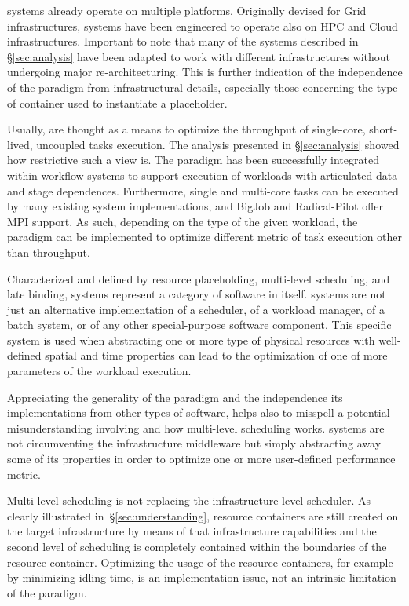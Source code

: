 \documentclass{sig-alternate}
\begin{document}
\pilot systems already operate on multiple platforms. Originally devised for
Grid infrastructures, \pilot systems have been engineered to operate also on
HPC and Cloud infrastructures. Important to note that many of the \pilot
systems described in \S\ref{sec:analysis} have been adapted to work with
different infrastructures without undergoing major re-architecturing. This is
further indication of the independence of the \pilot paradigm from
infrastructural details, especially those concerning the type of container used
to instantiate a placeholder.

Usually, \pilots are thought as a means to optimize the throughput of
single-core, short-lived, uncoupled tasks execution. The analysis presented in
\S\ref{sec:analysis} showed how restrictive such a view is. The \pilot paradigm
has been successfully integrated within workflow systems to support execution
of workloads with articulated data and stage dependences. Furthermore, single
and multi-core tasks can be executed by many existing \pilot system
implementations, and BigJob and Radical-Pilot offer MPI support. As such,
depending on the type of the given workload, the \pilot paradigm can be
implemented to optimize different metric of task execution other than
throughput.

Characterized and defined by resource placeholding, multi-level scheduling, and
late binding, \pilot systems represent a category of software in itself. \pilot
systems are not just an alternative implementation of a scheduler, of a
workload manager, of a batch system, or of any other special-purpose software
component. This specific system is used when abstracting one or more type of
physical resources with well-defined spatial and time properties can lead to
the optimization of one of more parameters of the workload execution.

Appreciating the generality of the \pilot paradigm and the independence its
implementations from other types of software, helps also to misspell a
potential misunderstanding involving \pilots and how multi-level scheduling
works. \pilot systems are not circumventing the infrastructure middleware but
simply abstracting away some of its properties in order to optimize one or more
user-defined performance metric.

Multi-level scheduling is not replacing the infrastructure-level scheduler. As
clearly illustrated in~\S\ref{sec:understanding}, resource containers are still
created on the target infrastructure by means of that infrastructure
capabilities and the second level of scheduling is completely contained within
the boundaries of the resource container. Optimizing the usage of the resource
containers, for example by minimizing idling time, is an implementation issue,
not an intrinsic limitation of the \pilot paradigm.
\end{document}
